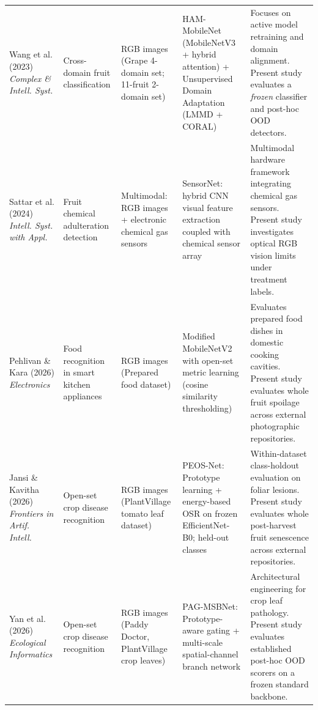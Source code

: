 \begin{table}[!t]
\begin{tabular}{>{\raggedright\arraybackslash}p{2.4cm} >{\raggedright\arraybackslash}p{2.3cm} >{\raggedright\arraybackslash}p{2.6cm} >{\raggedright\arraybackslash}p{3.5cm} >{\raggedright\arraybackslash}p{4.2cm}}
\addlinespace[3pt]
Wang et al. (2023) \cite{wang2023crossdomain} \newline \textit{Complex \& Intell. Syst.} & Cross-domain fruit classification & RGB images \newline (Grape 4-domain set; 11-fruit 2-domain set) & HAM-MobileNet (MobileNetV3 + hybrid attention) + Unsupervised Domain Adaptation (LMMD + CORAL) & Focuses on active model retraining and domain alignment. Present study evaluates a \textit{frozen} classifier and post-hoc OOD detectors. \\
\addlinespace[3pt]
Sattar et al. (2024) \cite{sattar2024sensornet} \newline \textit{Intell. Syst. with Appl.} & Fruit chemical adulteration detection & Multimodal: RGB images + electronic chemical gas sensors & SensorNet: hybrid CNN visual feature extraction coupled with chemical sensor array & Multimodal hardware framework integrating chemical gas sensors. Present study investigates optical RGB vision limits under treatment labels. \\
\addlinespace[3pt]
Pehlivan \& Kara (2026) \cite{pehlivan2026lightweight} \newline \textit{Electronics} & Food recognition in smart kitchen appliances & RGB images \newline (Prepared food dataset) & Modified MobileNetV2 with open-set metric learning (cosine similarity thresholding) & Evaluates prepared food dishes in domestic cooking cavities. Present study evaluates whole fruit spoilage across external photographic repositories. \\
\addlinespace[3pt]
Jansi \& Kavitha (2026) \cite{jansi2026peos} \newline \textit{Frontiers in Artif. Intell.} & Open-set crop disease recognition & RGB images \newline (PlantVillage tomato leaf dataset) & PEOS-Net: Prototype learning + energy-based OSR on frozen EfficientNet-B0; held-out classes & Within-dataset class-holdout evaluation on foliar lesions. Present study evaluates whole post-harvest fruit senescence across external repositories. \\
\addlinespace[3pt]
Yan et al. (2026) \cite{yan2026pagmsbnet} \newline \textit{Ecological Informatics} & Open-set crop disease recognition & RGB images \newline (Paddy Doctor, PlantVillage crop leaves) & PAG-MSBNet: Prototype-aware gating + multi-scale spatial-channel branch network & Architectural engineering for crop leaf pathology. Present study evaluates established post-hoc OOD scorers on a frozen standard backbone. \\

\end{tabular}
\end{table}
